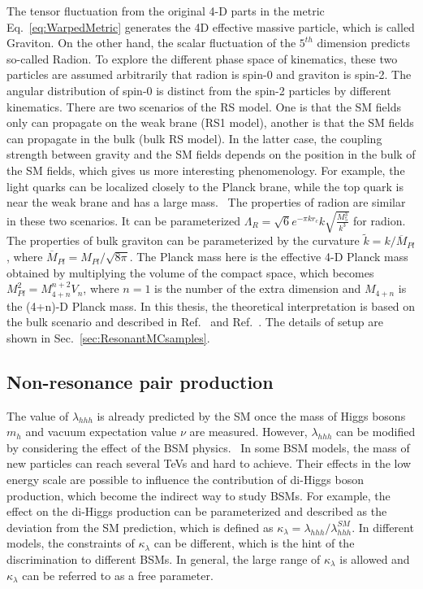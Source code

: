 The tensor fluctuation from the original 4-D parts in the metric Eq.~\ref{eq:WarpedMetric} generates the 4D effective massive particle, which is called Graviton.
On the other hand, the scalar fluctuation of the $5^{th}$ dimension predicts so-called Radion.
To explore the different phase space of kinematics, these two particles are assumed arbitrarily that radion is spin-0 and graviton is spin-2.
The angular distribution of spin-0 is distinct from the spin-2 particles by different kinematics.
There are two scenarios of the RS model. 
One is that the SM fields only can propagate on the weak brane (RS1 model), another is that the SM fields can propagate in the bulk (bulk RS model).
In the latter case, the coupling strength between gravity and the SM fields depends on the position in the bulk of the SM fields, which gives us more interesting phenomenology.
For example, the light quarks can be localized closely to the Planck brane, while the top quark is near the weak brane and has a large mass.~\cite{hep-ph/0701150}
The properties of radion are similar in these two scenarios.
It can be parameterized $\Lambda_{R}=\sqrt{6}e^{-\pi k r_{c}}k\sqrt{\frac{M_{5}^{3}}{k^{3}}}$ for radion. %
The properties of bulk graviton can be parameterized by the curvature $\widetilde{k}=k/\overline{M}_{Pl}$, where $\overline{M}_{Pl}=M_{Pl}/\sqrt{8\pi}$.
The Planck mass here is the effective 4-D Planck mass obtained by multiplying the volume of the compact space, which becomes $M_{Pl}^{2}=M_{4+n}^{n+2}V_{n}$, where $n=1$ is the number of the extra dimension and $M_{4+n}$ is the (4+n)-D Planck mass.
In this thesis, the theoretical interpretation is based on the bulk scenario and described in Ref.~\cite{1404.0102} and Ref.~\cite{WEDXSgithub}. The details of setup are shown in Sec.~\ref{sec:ResonantMCsamples}.

\subsection{Non-resonance pair production}\label{sec:nonResTheory}

The value of $\lambda_{hhh}$ is already predicted by the SM once the mass of Higgs bosons $m_{h}$ and vacuum expectation value $\nu$ are measured.
However, $\lambda_{hhh}$ can be modified by considering the effect of the BSM physics.~\cite{1401.0935}
In some BSM models, the mass of new particles can reach several TeVs and hard to achieve.
Their effects in the low energy scale are possible to influence the contribution of di-Higgs boson production, which become the indirect way to study BSMs.
For example, the effect on the di-Higgs production can be parameterized and described as the deviation from the SM prediction, which is defined as $\kappa_{\lambda}=\lambda_{hhh}/\lambda_{hhh}^{SM}$.
In different models, the constraints of $\kappa_{\lambda}$ can be different, which is the hint of the discrimination to different BSMs.
In general, the large range of $\kappa_{\lambda}$ is allowed and $\kappa_{\lambda}$ can be referred to as a free parameter.

